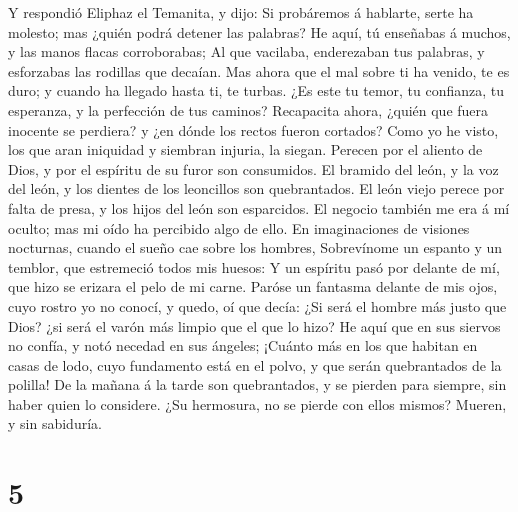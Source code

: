  Y respondió Eliphaz el Temanita, y dijo:  Si
probáremos á hablarte, serte ha molesto; mas ¿quién podrá detener las
palabras?  He aquí, tú enseñabas á muchos, y las manos
flacas corroborabas;  Al que vacilaba, enderezaban tus
palabras, y esforzabas las rodillas que decaían.  Mas ahora
que el mal sobre ti ha venido, te es duro; y cuando ha llegado hasta ti,
te turbas.  ¿Es este tu temor, tu confianza, tu esperanza, y
la perfección de tus caminos?  Recapacita ahora, ¿quién que
fuera inocente se perdiera? y ¿en dónde los rectos fueron cortados?
 Como yo he visto, los que aran iniquidad y siembran
injuria, la siegan.  Perecen por el aliento de Dios, y por
el espíritu de su furor son consumidos.  El bramido del
león, y la voz del león, y los dientes de los leoncillos son
quebrantados.  El león viejo perece por falta de presa, y
los hijos del león son esparcidos.  El negocio también me
era á mí oculto; mas mi oído ha percibido algo de ello.  En
imaginaciones de visiones nocturnas, cuando el sueño cae sobre los
hombres,  Sobrevínome un espanto y un temblor, que
estremeció todos mis huesos:  Y un espíritu pasó por
delante de mí, que hizo se erizara el pelo de mi carne. 
Paróse un fantasma delante de mis ojos, cuyo rostro yo no conocí, y
quedo, oí que decía:  ¿Si será el hombre más justo que
Dios? ¿si será el varón más limpio que el que lo hizo?  He
aquí que en sus siervos no confía, y notó necedad en sus ángeles;
 ¡Cuánto más en los que habitan en casas de lodo, cuyo
fundamento está en el polvo, y que serán quebrantados de la polilla!
 De la mañana á la tarde son quebrantados, y se pierden
para siempre, sin haber quien lo considere.  ¿Su hermosura,
no se pierde con ellos mismos? Mueren, y sin sabiduría.

\hypertarget{section-4}{%
\section{5}\label{section-4}}

